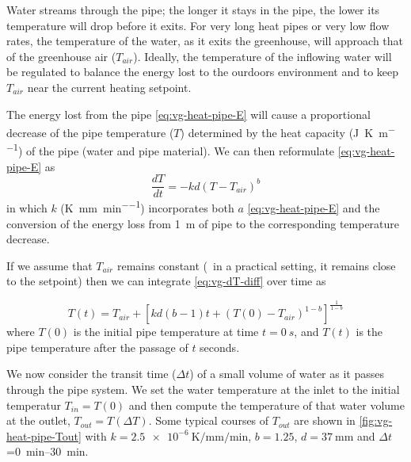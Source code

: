 Water streams through the pipe; the longer it stays in the pipe, the lower its temperature will drop before it exits. For very long heat pipes or very low flow rates, the temperature of the water, as it exits the greenhouse, will approach that of the greenhouse air ($T_{air}$). Ideally, the temperature of the inflowing water will be regulated to balance the energy lost to the ourdoors environment and to keep $T_{air}$ near the current heating setpoint.

The energy lost from the pipe \eqref{eq:vg-heat-pipe-E} will cause a proportional decrease of the pipe temperature ($T$) determined by the heat capacity (\si{\joule\per\kelvin\per\meter}) of the pipe (water and pipe material). We can then reformulate \cref{eq:vg-heat-pipe-E} as
\begin{equation}
  \frac{dT}{dt} = -kd\left(T-T_{air}\right)^b  
  \label{eq:vg-dT-diff}
\end{equation}
in which $k$ (\si{\kelvin\per\milli\meter\per\minute}) incorporates both $a$ \eqref{eq:vg-heat-pipe-E} and the conversion of the energy loss from \SI{1}{m} of pipe to the corresponding temperature decrease.

If we assume that $T_{air}$ remains constant (\ie\ in a practical setting, it remains close to the setpoint) then we can integrate \cref{eq:vg-dT-diff} over time as 

\begin{equation}
  T(t) = T_{air} + \left[ kd(b-1)t + \left( T(0)-T_{air}\right)^{1-b}  \right]^\frac{1}{1-b} 
  \label{eq:vg-T-integrated}
\end{equation}
where $T(0)$ is the initial pipe temperature at time $t=\SI{0}{s}$, and $T(t)$ is the pipe temperature after the passage of $t$ seconds. 

We now consider the transit time ($\Delta t$) of a small volume of water as it passes through the pipe system. We set the water temperature at the inlet to the initial temperatur $T_{in}=T(0)$ and then compute the temperature of that water volume at the outlet, $T_{out}=T(\Delta T)$. Some typical courses of $T_{out}$ are shown in \cref{fig:vg-heat-pipe-Tout} with $k=\SI{2.5e-6}{\kelvin\per\milli\meter\per\minute}$, $b=1.25$, $d=\SI{37}{\milli\meter}$ and $\Delta t$=\SIrange{0}{30}{\minute}.

